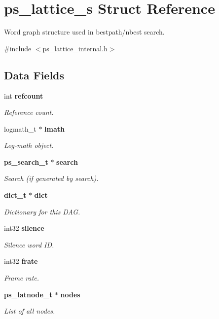 \section{ps\+\_\+lattice\+\_\+s Struct Reference}
\label{structps__lattice__s}


Word graph structure used in bestpath/nbest search.  




{\ttfamily \#include $<$ps\+\_\+lattice\+\_\+internal.\+h$>$}

\subsection*{Data Fields}
\begin{DoxyCompactItemize}
\item 
int {\bf refcount}
\begin{DoxyCompactList}\small\item\em Reference count. \end{DoxyCompactList}\item 
logmath\+\_\+t $\ast$ {\bf lmath}
\begin{DoxyCompactList}\small\item\em Log-\/math object. \end{DoxyCompactList}\item 
{\bf ps\+\_\+search\+\_\+t} $\ast$ {\bf search}
\begin{DoxyCompactList}\small\item\em Search (if generated by search). \end{DoxyCompactList}\item 
{\bf dict\+\_\+t} $\ast$ {\bf dict}
\begin{DoxyCompactList}\small\item\em Dictionary for this D\+A\+G. \end{DoxyCompactList}\item 
int32 {\bf silence}
\begin{DoxyCompactList}\small\item\em Silence word I\+D. \end{DoxyCompactList}\item 
int32 {\bf frate}
\begin{DoxyCompactList}\small\item\em Frame rate. \end{DoxyCompactList}\item 
{\bf ps\+\_\+latnode\+\_\+t} $\ast$ {\bf nodes}
\begin{DoxyCompactList}\small\item\em List of all nodes. \end{DoxyCompactList}\item 

\end{DoxyCompactItemize}
